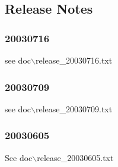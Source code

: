 \documentclass[a4paper,12pt]{article}
\begin{document}
\subsection{Release Notes}
\subsubsection{20030716}
\hspace*{10mm}see doc$\backslash$release\_20030716.txt

\subsubsection{20030709}
\hspace*{10mm}see doc$\backslash$release\_20030709.txt

\subsubsection{20030605}
\hspace*{10mm}See doc$\backslash$release\_20030605.txt
\end{document}
